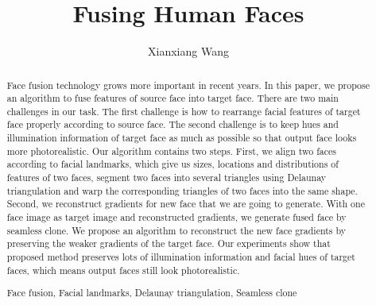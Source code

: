 \documentclass[runningheads,a4paper]{llncs}
\newcommand{\keywords}[1]{\par\addvspace\baselineskip
\noindent\keywordname\enspace\ignorespaces#1}
\begin{document}
\mainmatter
\title{Fusing Human Faces}
\author{Xianxiang Wang}
\maketitle


\begin{abstract}
Face fusion technology grows more important in recent years. In this paper, we propose an algorithm to fuse features of source face into target face. There are two main challenges in our task. The first challenge is how to rearrange facial features of target face properly according to source face. The second challenge is to keep hues and illumination information of target face as much as possible so that output face looks more photorealistic. Our algorithm contains two steps. First, we align two faces according to facial landmarks, which give us sizes, locations and distributions  of features of two faces, segment two faces into several triangles using Delaunay triangulation and warp the corresponding triangles of two faces into the same shape. Second, we reconstruct gradients for new face that we are going to generate. With one face image as target image and reconstructed gradients, we generate fused face by seamless clone. We propose an algorithm to reconstruct the new face gradients by preserving the weaker gradients of the target face. Our experiments show that proposed method preserves lots of illumination information and facial hues of target faces, which means output faces still look photorealistic.
\keywords{Face fusion, Facial landmarks, Delaunay triangulation, Seamless clone}
\end{abstract}








\end{document}
